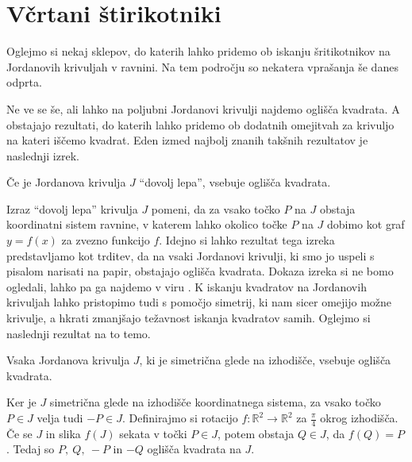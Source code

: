 \documentclass[mat1]{fmfdelo}
\newcommand{\R}{\mathbb R}
\begin{document}
\section{Včrtani štirikotniki}
Oglejmo si nekaj sklepov, do katerih lahko pridemo ob iskanju šritikotnikov na Jordanovih krivuljah v ravnini. Na tem področju so nekatera vprašanja še danes odprta. 

Ne ve se še, ali lahko na poljubni Jordanovi krivulji najdemo oglišča kvadrata. A obstajajo rezultati, do katerih lahko pridemo ob dodatnih omejitvah za krivuljo na kateri iščemo kvadrat. Eden izmed najbolj znanih takšnih rezultatov je naslednji izrek.

\begin{izrek}
Če je Jordanova krivulja $J$ ``dovolj lepa'', vsebuje oglišča kvadrata.
\end{izrek}

Izraz ``dovolj lepa'' krivulja $J$ pomeni, da za vsako točko $P$ na $J$ obstaja koordinatni sistem ravnine, v katerem lahko okolico točke $P$ na $J$ dobimo kot graf $y = f(x)$ za zvezno funkcijo $f$. Idejno si lahko rezultat tega izreka predstavljamo kot trditev, da na vsaki Jordanovi krivulji, ki smo jo uspeli s pisalom narisati na papir, obstajajo oglišča kvadrata. Dokaza izreka si ne bomo ogledali, lahko pa ga najdemo v viru \cite{izrek_stromquist}. K iskanju kvadratov na Jordanovih krivuljah lahko pristopimo tudi s pomočjo simetrij, ki nam sicer omejijo možne krivulje, a hkrati zmanjšajo težavnost iskanja kvadratov samih. Oglejmo si naslednji rezultat na to temo.

\begin{trditev}\label{trd:kvadrat}
Vsaka Jordanova krivulja $J$, ki je simetrična glede na izhodišče, vsebuje oglišča kvadrata.
\end{trditev}

\proof
Ker je $J$ simetrična glede na izhodišče koordinatnega sistema, za vsako točko $P \in J$ velja tudi $-P \in J$. Definirajmo si rotacijo $f \colon \R^2 \to \R^2$ za $\frac{\pi}{4}$ okrog izhodišča. Če se $J$ in slika $f(J)$ sekata v točki $P \in J$, potem obstaja $Q \in J$, da $f(Q) = P$. Tedaj so $P,~Q,~-P$ in $-Q$ oglišča kvadrata na $J$.

\begin{center}
\end{center}
\end{document}
